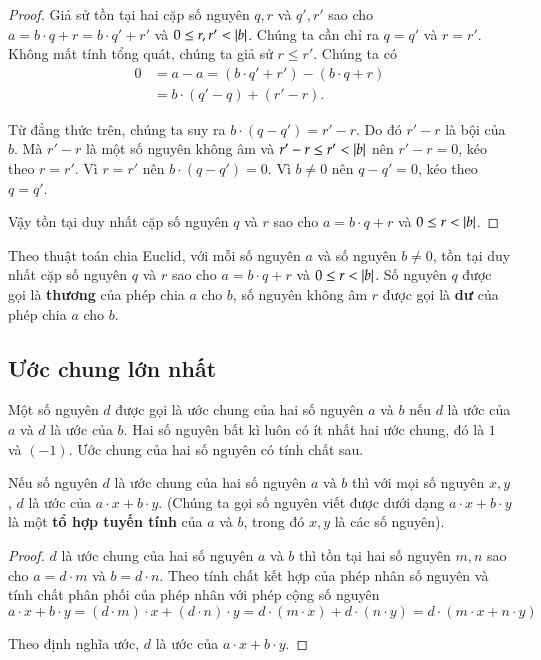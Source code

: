 \begin{proof}
	Giả sử tồn tại hai cặp số nguyên $q, r$ và $q', r'$ sao cho $a = b\cdot q + r = b\cdot q' + r'$ và $0\leq r, r' < \left\vert{b}\right\vert$. Chúng ta cần chỉ ra $q = q'$ và $r = r'$. Không mất tính tổng quát, chúng ta giả sử $r\leq r'$. Chúng ta có
	\begin{align*}
		0 & = a - a = (b\cdot q' + r') - (b\cdot q + r) \\
		  & = b\cdot (q' - q) + (r' - r).
	\end{align*}

	Từ đẳng thức trên, chúng ta suy ra $b\cdot (q - q') = r' - r$. Do đó $r' - r$ là bội của $b$. Mà $r' - r$ là một số nguyên không âm và $r' - r\leq r' < \left\vert{b}\right\vert$ nên $r' - r = 0$, kéo theo $r = r'$. Vì $r = r'$ nên $b\cdot (q - q') = 0$. Vì $b\ne 0$ nên $q - q' = 0$, kéo theo $q = q'$.

	Vậy tồn tại duy nhất cặp số nguyên $q$ và $r$ sao cho $a = b\cdot q + r$ và $0\leq r < \left\vert{b}\right\vert$.
\end{proof}

\begin{definition}[Thương và Dư]
	Theo thuật toán chia Euclid, với mỗi số nguyên $a$ và số nguyên $b\ne 0$, tồn tại duy nhất cặp số nguyên $q$ và $r$ sao cho $a = b\cdot q + r$ và $0\leq r < \left\vert{b}\right\vert$. Số nguyên $q$ được gọi là \textbf{thương} của phép chia $a$ cho $b$, số nguyên không âm $r$ được gọi là \textbf{dư} của phép chia $a$ cho $b$.
\end{definition}

\subsection*{Ước chung lớn nhất}

Một số nguyên $d$ được gọi là ước chung của hai số nguyên $a$ và $b$ nếu $d$ là ước của $a$ và $d$ là ước của $b$. Hai số nguyên bất kì luôn có ít nhất hai ước chung, đó là $1$ và $(-1)$. Ước chung của hai số nguyên có tính chất sau.

\begin{theorem}\label{theorem:linear-combination-and-common-divisor}
	Nếu số nguyên $d$ là ước chung của hai số nguyên $a$ và $b$ thì với mọi số nguyên $x, y$, $d$ là ước của $a\cdot x + b\cdot y$. (Chúng ta gọi số nguyên viết được dưới dạng $a\cdot x + b\cdot y$ là một \textbf{tổ hợp tuyến tính} của $a$ và $b$, trong đó $x, y$ là các số nguyên).
\end{theorem}

\begin{proof}
	$d$ là ước chung của hai số nguyên $a$ và $b$ thì tồn tại hai số nguyên $m, n$ sao cho $a = d\cdot m$ và $b = d\cdot n$. Theo tính chất kết hợp của phép nhân số nguyên và tính chất phân phối của phép nhân với phép cộng số nguyên
	\[
		a\cdot x + b\cdot y = (d\cdot m)\cdot x + (d\cdot n)\cdot y = d\cdot (m\cdot x) + d\cdot (n\cdot y) = d\cdot (m\cdot x + n\cdot y)
	\]

	Theo định nghĩa ước, $d$ là ước của $a\cdot x + b\cdot y$.
\end{proof}

